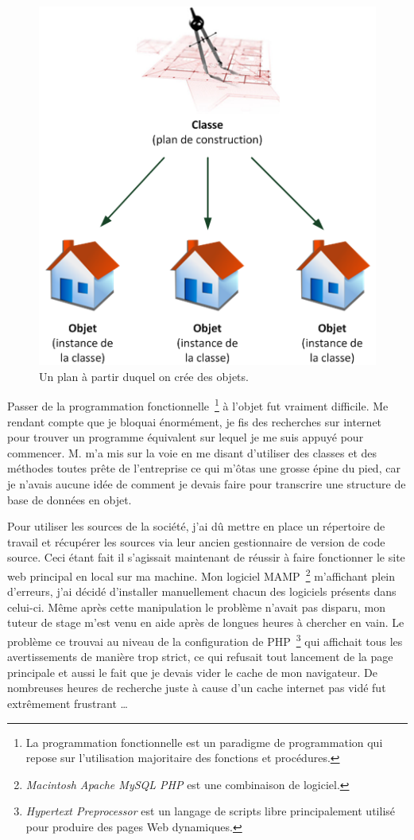 \begin{figure}
\begin{center}
\includegraphics[scale=0.5]{images/objet.png}
\end{center}
\caption{Un plan à partir duquel on crée des objets.}
\end{figure}

Passer de la programmation fonctionnelle\, \footnote{La programmation
fonctionnelle est un paradigme de programmation qui repose sur l'utilisation
majoritaire des fonctions et procédures.} à l'objet fut vraiment difficile. Me
rendant compte que je bloquai énormément, je fis des recherches sur internet
pour trouver un programme équivalent sur lequel je me suis appuyé pour
commencer. M. m'a mis sur la voie en me disant d'utiliser des
classes et des méthodes toutes prête de l'entreprise ce qui m'ôtas une grosse
épine du pied, car je n'avais aucune idée de comment je devais faire pour
transcrire une structure de base de données en objet.

Pour utiliser les sources de la société, j'ai dû mettre en place un répertoire
de travail et récupérer les sources via leur ancien gestionnaire de version de
code source. Ceci étant fait il s'agissait maintenant de réussir à faire
fonctionner le site web principal en local sur ma machine. Mon logiciel MAMP\,
\footnote{\emph{Macintosh Apache MySQL PHP} est une combinaison de logiciel.}
m'affichant plein d'erreurs, j'ai décidé d'installer manuellement chacun des
logiciels présents dans celui-ci. Même après cette manipulation le problème
n'avait pas disparu, mon tuteur de stage m'est venu en aide après de longues
heures à chercher en vain. Le problème ce trouvai au niveau de la configuration
de PHP\, \footnote{\emph{Hypertext Preprocessor} est un langage de scripts
libre principalement utilisé pour produire des pages Web dynamiques.} qui
affichait tous les avertissements de manière trop strict, ce qui refusait tout
lancement de la page principale et aussi le fait que je devais vider le cache
de mon navigateur. De nombreuses heures de recherche juste à cause d'un cache
internet pas vidé fut extrêmement frustrant \ldots{}


